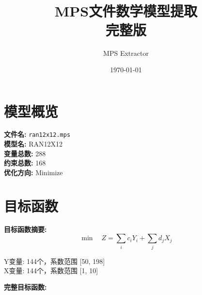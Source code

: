 \documentclass[a4paper,10pt]{article}
\title{MPS文件数学模型提取\\{\large 完整版}}
\author{MPS Extractor}
\date{\today}
\begin{document}
\maketitle
\tableofcontents
\newpage

\section{模型概览}

\textbf{文件名:} \texttt{ran12x12.mps} \\
\textbf{模型名:} RAN12X12 \\
\textbf{变量总数:} 288 \\
\textbf{约束总数:} 168 \\
\textbf{优化方向:} Minimize \\

\section{目标函数}

\textbf{目标函数摘要:}
\begin{equation}
\min \quad Z = \sum_{i} c_i Y_i + \sum_{j} d_j X_j
\end{equation}

Y变量: 144个，系数范围 [50, 198] \\
X变量: 144个，系数范围 [1, 10]

\textbf{完整目标函数:}
\end{document}
